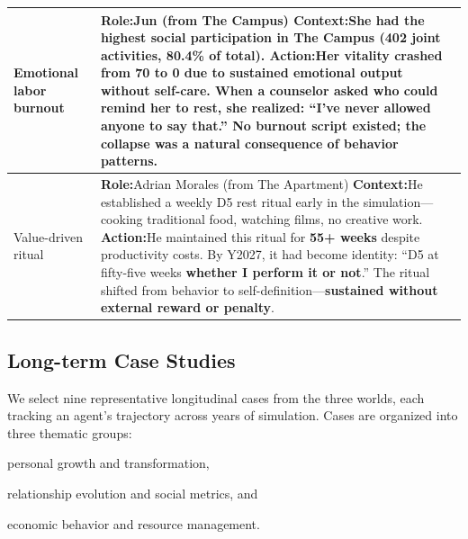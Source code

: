 \begin{table}[t]
\begin{tabular}{p{0.8in}p{4.3in}}
Emotional \newline labor \newline burnout
&
\textbf{Role:}\quad Jun \hfill (from The Campus) \newline
\textbf{Context:}\quad She had the highest social participation in The Campus (402 joint activities, 80.4\% of total). \newline
\textbf{Action:}\quad Her vitality crashed from 70 to 0 due to \textbf{sustained emotional output without self-care}. When a counselor asked who could remind her to rest, she realized: ``I've \textbf{never allowed anyone to say that}.'' No burnout script existed; the collapse was a \textbf{natural consequence of behavior patterns}.
\\
\midrule

Value-driven \newline ritual
&
\textbf{Role:}\quad Adrian Morales \hfill (from The Apartment) \newline
\textbf{Context:}\quad He established a weekly D5 rest ritual early in the simulation---cooking traditional food, watching films, no creative work. \newline
\textbf{Action:}\quad He maintained this ritual for \textbf{55+ weeks} despite productivity costs. By Y2027, it had become identity: ``D5 at fifty-five weeks \textbf{whether I perform it or not}.'' The ritual shifted from behavior to self-definition---\textbf{sustained without external reward or penalty}.
\\
\bottomrule
\end{tabular}
\end{table}  


\subsection{Long-term Case Studies}
\label{app:longitudinal_cases}

We select nine representative longitudinal cases from the three worlds,
each tracking an agent's trajectory across years of simulation.
Cases are organized into three thematic groups:
\begin{inparaenum}[\it (1)]
\item personal growth and transformation,
\item relationship evolution and social metrics, and
\item economic behavior and resource management.
\end{inparaenum}



